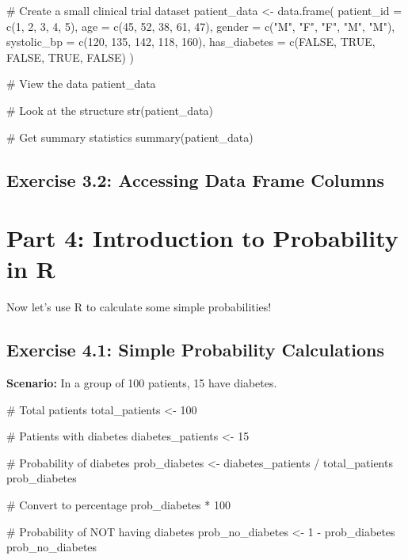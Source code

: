 \documentclass[11pt]{article}
\begin{document}
\begin{rcode}
# Create a small clinical trial dataset
patient_data <- data.frame(
  patient_id = c(1, 2, 3, 4, 5),
  age = c(45, 52, 38, 61, 47),
  gender = c("M", "F", "F", "M", "M"),
  systolic_bp = c(120, 135, 142, 118, 160),
  has_diabetes = c(FALSE, TRUE, FALSE, TRUE, FALSE)
)

# View the data
patient_data

# Look at the structure
str(patient_data)

# Get summary statistics
summary(patient_data)
\end{rcode}

\subsection{Exercise 3.2: Accessing Data Frame Columns}


\section{Part 4: Introduction to Probability in R}

Now let's use R to calculate some simple probabilities!

\subsection{Exercise 4.1: Simple Probability Calculations}

\textbf{Scenario:} In a group of 100 patients, 15 have diabetes.

\begin{rcode}
# Total patients
total_patients <- 100

# Patients with diabetes
diabetes_patients <- 15

# Probability of diabetes
prob_diabetes <- diabetes_patients / total_patients
prob_diabetes

# Convert to percentage
prob_diabetes * 100

# Probability of NOT having diabetes
prob_no_diabetes <- 1 - prob_diabetes
prob_no_diabetes
\end{rcode}
\end{document}
